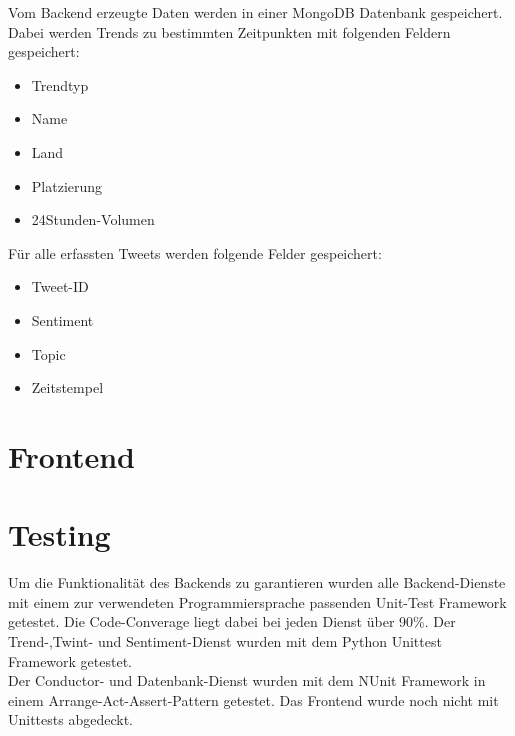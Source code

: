 \documentclass[conference]{IEEEtran}
\begin{document}
\smallskip

Vom Backend erzeugte Daten werden in einer MongoDB Datenbank gespeichert.
Dabei werden Trends zu bestimmten Zeitpunkten mit folgenden Feldern gespeichert:
\begin{itemize}
    \item Trendtyp
    \item Name
    \item Land
    \item Platzierung
    \item 24Stunden-Volumen
\end{itemize}
Für alle erfassten Tweets werden folgende Felder gespeichert:
\begin{itemize}
    \item Tweet-ID
    \item Sentiment
    \item Topic
    \item Zeitstempel
\end{itemize}

\section{Frontend}

\section{Testing}
Um die Funktionalität des Backends zu garantieren wurden alle Backend-Dienste mit einem zur verwendeten Programmiersprache passenden Unit-Test Framework getestet.
Die Code-Converage liegt dabei bei jeden Dienst über 90\%.
Der Trend-,Twint- und Sentiment-Dienst wurden mit dem Python Unittest\cite{unittest} Framework getestet.\\
Der Conductor- und Datenbank-Dienst wurden mit dem NUnit\cite{nunit} Framework in einem Arrange-Act-Assert-Pattern getestet.
Das Frontend wurde noch nicht mit Unittests abgedeckt.
\end{document}
